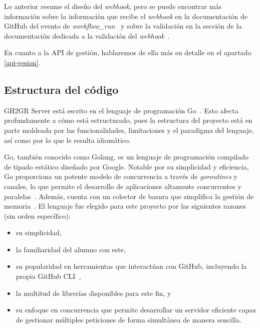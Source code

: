 Lo anterior resume el diseño del \textit{webhook}, pero se puede encontrar más información sobre la información que recibe el \textit{webhook} en la documentación de GitHub del evento de \textit{workflow\_run}~\cite{githubWebhookEvents} y sobre la validación en la sección de la documentación dedicada a la validación del \textit{webhook}~\cite{githubValidatingWebhook}.

En cuanto a la \acrshort{API} de gestión, hablaremos de ella más en detalle en el apartado \ref{api-gesion}.
\subsection{Estructura del código}

GH2GR Server está escrito en el lenguaje de programación Go~\cite{goProgrammingLanguage}. Esto afecta profundamente a cómo está estructurado, pues la estructura del proyecto está en parte moldeada por las funcionalidades, limitaciones y el paradigma del lenguaje, así como por lo que le resulta idiomático.

Go, también conocido como Golang, es un lenguaje de programación compilado de tipado estático diseñado por Google. Notable por su simplicidad y eficiencia, Go proporciona un potente modelo de concurrencia a través de \textit{goroutines} y canales, lo que permite el desarrollo de aplicaciones altamente concurrentes y paralelas~\cite{stackoverflowWhatapossGreat}. Además, cuenta con un colector de basura que simplifica la gestión de memoria~\cite{golangGuideGarbage}. El lenguaje fue elegido para este proyecto por las siguientes razones (sin orden específico): 
\begin{itemize}
    \item su simplicidad, 
    \item la familiaridad del alumno con este, 
    \item su popularidad en herramientas que interactúan con GitHub, incluyendo la propia GitHub CLI~\cite{githubGitHubClicli}, 
    \item la multitud de librerías disponibles para este fin, y 
    \item su enfoque en concurrencia que permite desarrollar un servidor eficiente capaz de gestionar múltiples peticiones de forma simultánea de manera sencilla.
\end{itemize}


